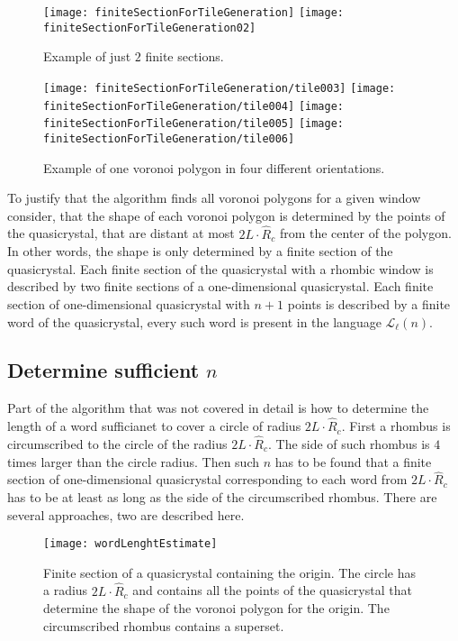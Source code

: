 \documentclass[text.tex]{subfiles}
\begin{document}
\begin{figure}[h]
\centering
\texttt{[image: finiteSectionForTileGeneration]}
\texttt{[image: finiteSectionForTileGeneration02]}
\caption{Example of just $2$ finite sections.}
\label{fig:finiteSectionForTileGeneration}
\end{figure}

\begin{figure}[h]
\centering
\texttt{[image: finiteSectionForTileGeneration/tile003]}
\texttt{[image: finiteSectionForTileGeneration/tile004]}
\texttt{[image: finiteSectionForTileGeneration/tile005]}
\texttt{[image: finiteSectionForTileGeneration/tile006]}
\caption{Example of one voronoi polygon in four different orientations.}
\label{fig:finiteSectionForTileGeneration:more}
\end{figure}

To justify that the algorithm finds all voronoi polygons for a given window consider, that the shape of each voronoi polygon is determined by the points of the quasicrystal, that are distant at most $2L\cdot\hat{R}_c$ from the center of the polygon. In other words, the shape is only determined by a finite section of the quasicrystal. Each finite section of the quasicrystal with a rhombic window is described by two finite sections of a one-dimensional quasicrystal. Each finite section of one-dimensional quasicrystal with $n+1$ points is described by a finite word of the quasicrystal, every such word is present in the language $\mathcal{L}_{\ell}(n)$.

\subsection{Determine sufficient $n$}
Part of the algorithm that was not covered in detail is how to determine the length of a word sufficianet to cover a circle of radius $2L\cdot\hat{R}_c$. First a rhombus is circumscribed to the circle of the radius $2L\cdot\hat{R}_c$. The side of such rhombus is $4$ times larger than the circle radius. Then such $n$ has to be found that a finite section of one-dimensional quasicrystal corresponding to each word from $2L\cdot\hat{R}_c$ has to be at least as long as the side of the circumscribed rhombus. 
There are several approaches, two are described here. 

\begin{figure}[h]
\centering
\texttt{[image: wordLenghtEstimate]}
\caption{Finite section of a quasicrystal containing the origin. The circle has a radius $2L\cdot\hat{R}_c$ and contains all the points of the quasicrystal that determine the shape of the voronoi polygon for the origin. The circumscribed rhombus contains a superset.}
\label{fig:wordLenghtEstimate}
\end{figure}
\end{document}
